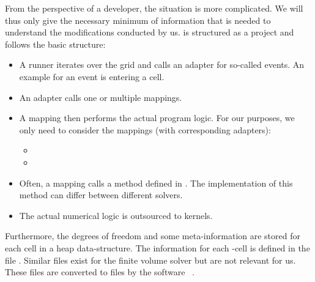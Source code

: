 From the perspective of a developer, the situation is more complicated.
We will thus only give the necessary minimum of information that is needed to understand the modifications conducted by us.
\exahype{} is structured as a \peano{} project and follows the basic structure:
\begin{itemize}
\item A runner iterates over the grid and calls an adapter for so-called events.
  An example for an event is entering a cell.
\item An adapter calls one or multiple mappings.
\item A mapping then performs the actual program logic.
  For our purposes, we only need to consider the mappings (with corresponding adapters):
  \begin{itemize}
  \item {}
  \item {}
  \end{itemize}
\item Often, a mapping calls a method defined in .
  The implementation of this method can differ between different solvers.
\item The actual numerical logic is outsourced to kernels.
\end{itemize}
Furthermore, the degrees of freedom and some meta-information are stored for each cell in a heap data-structure.
The information for each \dg{}-cell is defined in the file .
Similar files exist for the finite volume solver but are not relevant for us.
These files are converted to \cpp{} files by the software ~\cite{bungartz2008dastgen}.

